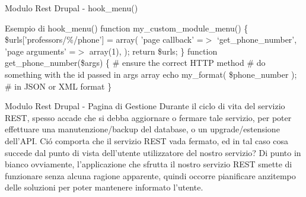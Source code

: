 \documentclass{beamer}
\begin{document}
\begin{frame}{Modulo Rest Drupal - hook\_menu() }
\begin{exampleblock}{Esempio di hook\_menu()}
{\small
function my\_custom\_module\_menu() \{
\newline
\hspace*{5 mm}\$urls['professors/\%/phone'] = array(
\newline
\hspace*{10 mm}'page callback' =$>$ `get\_phone\_number',
\newline
\hspace*{10 mm}'page arguments' =$>$ array(1),
\newline
\hspace*{5 mm});
\newline
\hspace*{5 mm}return \$urls;
\newline
\}
\newline
function get\_phone\_number(\$args) \{
\newline
\hspace*{5 mm}\# ensure the correct HTTP method
\newline
\hspace*{5 mm}\# do something with the id passed in args array
\newline
\hspace*{5 mm}echo my\_format( \$phone\_number ); \# in JSON or XML format
\newline
\}
}
\end{exampleblock}
\end{frame}


\begin{frame}{Modulo Rest Drupal - Pagina di Gestione}
Durante il ciclo di vita del servizio REST, spesso accade che si debba aggiornare o
fermare tale servizio, per poter effettuare una manutenzione/backup del database, o un upgrade/estensione dell'API.
\newline
Ci\'o comporta che il servizio REST vada fermato, ed in tal caso cosa succede dal punto di vista dell'utente utilizzatore del nostro
servizio?
\newline
Di punto in bianco ovviamente, l'applicazione che sfrutta il nostro servizio REST smette di funzionare senza alcuna ragione
apparente, quindi occorre pianificare anzitempo delle soluzioni per poter mantenere informato l'utente.
\end{frame}
\end{document}

